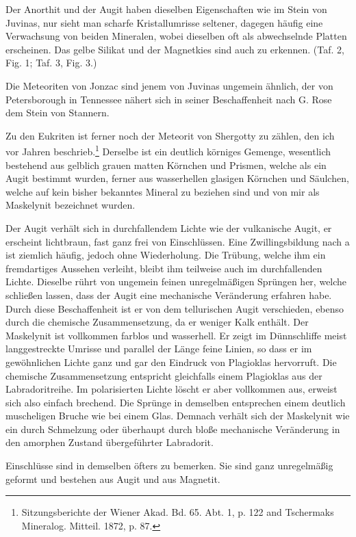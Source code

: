 \documentclass[a4paper, 11pt, oneside, polutonikogreek, german]{article}
\begin{document}
Der Anorthit und der Augit haben dieselben Eigenschaften wie im Stein von Juvinas, nur sieht man scharfe Kristallumrisse seltener, dagegen häufig eine Verwachsung von beiden Mineralen, wobei dieselben oft als abwechselnde Platten erscheinen. Das gelbe Silikat und der Magnetkies sind auch zu erkennen. (Taf. 2, Fig. 1; Taf. 3, Fig. 3.)

Die Meteoriten von Jonzac sind jenem von Juvinas ungemein ähnlich, der von Petersborough in Tennessee nähert sich in seiner Beschaffenheit nach G. Rose dem Stein von Stannern.

Zu den Eukriten ist ferner noch der Meteorit von Shergotty zu zählen, den ich vor Jahren beschrieb.\footnote{Sitzungsberichte der Wiener Akad. Bd. 65. Abt. 1, p. 122 and Tschermaks Mineralog. Mitteil. 1872, p. 87.} Derselbe ist ein deutlich körniges Gemenge, wesentlich bestehend aus gelblich grauen matten Körnchen und Prismen, welche als ein Augit bestimmt wurden, ferner aus wasserhellen glasigen Körnchen und Säulchen, welche auf kein bisher bekanntes Mineral zu beziehen sind und von mir als Maskelynit bezeichnet wurden.

Der Augit verhält sich in durchfallendem Lichte wie der vulkanische Augit, er erscheint lichtbraun, fast ganz frei von Einschlüssen. Eine Zwillingsbildung nach a ist ziemlich häufig, jedoch ohne Wiederholung. Die Trübung, welche ihm ein fremdartiges Aussehen verleiht, bleibt ihm teilweise auch im durchfallenden Lichte. Dieselbe rührt von ungemein feinen unregelmäßigen Sprüngen her, welche schließen lassen, dass der Augit eine mechanische Veränderung erfahren habe. Durch diese Beschaffenheit ist er von dem tellurischen Augit verschieden, ebenso durch die chemische Zusammensetzung, da er weniger Kalk enthält. Der Maskelynit ist vollkommen farblos und wasserhell. Er zeigt im Dünnschliffe meist langgestreckte Umrisse und parallel der Länge feine Linien, so dass er im gewöhnlichen Lichte ganz und gar den Eindruck von Plagioklas hervorruft. Die chemische Zusammensetzung entspricht gleichfalls einem Plagioklas aus der Labradoritreihe. Im polarisierten Lichte löscht er aber vollkommen aus, erweist sich also einfach brechend. Die Sprünge in demselben entsprechen einem deutlich muscheligen Bruche wie bei einem Glas. Demnach verhält sich der Maskelynit wie ein durch Schmelzung oder überhaupt durch bloße mechanische Veränderung in den amorphen Zustand übergeführter Labradorit.

Einschlüsse sind in demselben öfters zu bemerken. Sie sind ganz unregelmäßig geformt und bestehen aus Augit und aus Magnetit.
\end{document}
